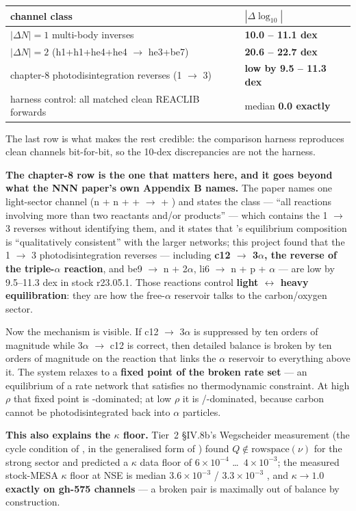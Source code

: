 \begin{tabularx}{\textwidth}{@{}Y L{5.0cm}@{}}
\toprule
\textbf{channel class} & \textbf{$|\Delta\log_{10}|$} \\
\midrule
$|\Delta N| = 1$ multi-body inverses & \textbf{10.0 -- 11.1 dex} \\
$|\Delta N| = 2$ (h1+h1+he4+he4 $\to$ he3+be7) & \textbf{20.6 -- 22.7 dex} \\
chapter-8 photodisintegration reverses (1 $\to$ 3) &
  \textbf{low by 9.5 -- 11.3 dex} \\
harness control: all matched clean REACLIB forwards &
  median \textbf{0.0 exactly} \\
\bottomrule
\end{tabularx}

The last row is what makes the rest credible: the comparison harness
reproduces clean channels bit-for-bit, so the 10-dex discrepancies are not the
harness.

\textbf{The chapter-8 row is the one that matters here, and it goes beyond what
the NNN paper's own Appendix B names.} The paper names one light-sector channel
(n + n +  +  $\to$  + ) and states
the class --- ``all reactions involving more than two reactants and/or
products'' --- which contains the 1 $\to$ 3 reverses without identifying them,
and it states that 's equilibrium composition is ``qualitatively
consistent'' with the larger networks; this project found that the 1 $\to$ 3
photodisintegration reverses --- including \textbf{c12 $\to$ 3$\alpha$, the
reverse of the triple-$\alpha$ reaction}, and be9 $\to$ n + 2$\alpha$, li6
$\to$ n + p + $\alpha$ --- are low by 9.5--11.3 dex in stock r23.05.1. Those
reactions control \textbf{light $\leftrightarrow$ heavy equilibration}: they
are how the free-$\alpha$ reservoir talks to the carbon/oxygen sector.

Now the mechanism is visible. If c12 $\to$ 3$\alpha$ is suppressed by ten
orders of magnitude while 3$\alpha$ $\to$ c12 is correct, then detailed balance
is broken by ten orders of magnitude on the reaction that links the $\alpha$
reservoir to everything above it. The system relaxes to a \textbf{fixed point
of the broken rate set} --- an equilibrium of a rate network that satisfies no
thermodynamic constraint. At high $\rho$ that fixed point is
-dominated; at low $\rho$ it is /-dominated,
because carbon cannot be photodisintegrated back into $\alpha$ particles.

\textbf{This also explains the $\kappa$ floor.} Tier~2 \S IV.8b's Wegscheider
measurement (the cycle condition of \citealt{wegscheider1901}, in the
generalised form of \citealt{schuster1989}) found
$Q \notin \mathrm{rowspace}(\nu)$ for the strong sector and predicted a
$\kappa$ data floor of $6 \times 10^{-4}$ \ldots\ $4 \times 10^{-3}$; the
measured stock-MESA $\kappa$ floor at NSE is median $3.6 \times 10^{-3}$ /
$3.3 \times 10^{-3}$ , and \textbf{$\kappa \to 1.0$
exactly on gh-575 channels} --- a broken pair is maximally out of balance by
construction.

